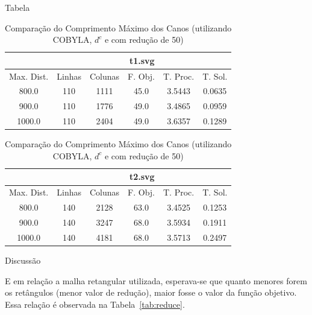 \documentclass[11pt]{beamer}
\begin{document}
\begin{frame}{Tabela}
\begin{table}
    \centering
    \caption{Comparação do Comprimento Máximo dos Canos (utilizando COBYLA,
    $d^c$ e com redução de 50)}
    \label{tab:maxd}
    \begin{tabular}{|c|c|c|c|c|c|}
        \hline
        & \multicolumn{5}{|c|}{t1.svg} \\ \hline
        Max. Dist. & Linhas & Colunas & F. Obj. & T. Proc. & T. Sol.  \\ \hline
        800.0 & 110 & 1111 & 45.0 & 3.5443 & 0.0635  \\ \hline
        900.0 & 110 & 1776 & 49.0 & 3.4865 & 0.0959  \\ \hline
        1000.0 & 110 & 2404 & 49.0 & 3.6357 & 0.1289  \\ \hline
    \end{tabular}
    \begin{tabular}{|c|c|c|c|c|c|}
    \hline
    & \multicolumn{5}{|c|}{t2.svg} \\ \hline
    Max. Dist. & Linhas & Colunas & F. Obj. & T. Proc. & T. Sol. \\ \hline
    800.0 & 140 & 2128 & 63.0 & 3.4525 & 0.1253 \\ \hline
    900.0 & 140 & 3247 & 68.0 & 3.5934 & 0.1911 \\ \hline
    1000.0 & 140 & 4181 & 68.0 & 3.5713 & 0.2497 \\ \hline
    \end{tabular}
\end{table}
\end{frame}

\begin{frame}{Discussão}
\begin{block}{}
E em relação a malha retangular utilizada, esperava-se que quanto menores forem
os retângulos (menor valor de redução), maior fosse o valor da função objetivo.
Essa relação é observada na Tabela~\ref{tab:reduce}.
\end{block}
\end{frame}
\end{document}

